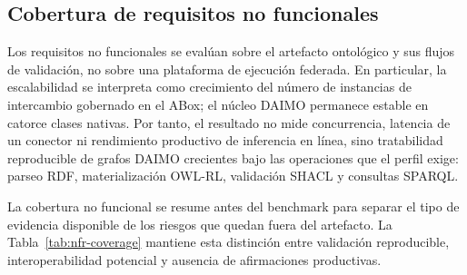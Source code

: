 \documentclass[Afour,sagev,times]{sagej}
\begin{document}
\subsection{Cobertura de requisitos no funcionales}\label{sec:eval-nfr}

Los requisitos no funcionales se evalúan sobre el artefacto ontológico y sus flujos de validación, no sobre una plataforma de ejecución federada. En particular, la escalabilidad se interpreta como crecimiento del número de instancias de intercambio gobernado en el ABox; el núcleo DAIMO permanece estable en catorce clases nativas. Por tanto, el resultado no mide concurrencia, latencia de un conector ni rendimiento productivo de inferencia en línea, sino tratabilidad reproducible de grafos DAIMO crecientes bajo las operaciones que el perfil exige: parseo RDF, materialización OWL-RL, validación SHACL y consultas SPARQL.

La cobertura no funcional se resume antes del benchmark para separar el tipo de evidencia disponible de los riesgos que quedan fuera del artefacto. La Tabla~\ref{tab:nfr-coverage} mantiene esta distinción entre validación reproducible, interoperabilidad potencial y ausencia de afirmaciones productivas.
\end{document}
